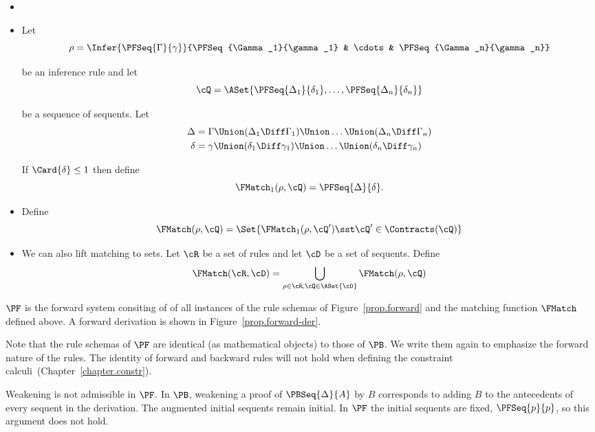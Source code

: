 \begin{definition}
  \begin{itemize}
  \item[]
  \item
    Let
    \[
    \rho = \Infer
    {\PFSeq{\Gamma}{\gamma}}
    {\PFSeq{\Gamma_1}{\gamma_1} & \cdots & \PFSeq{\Gamma_n}{\gamma_n}}
    \]

    \noindent
    be an inference rule and let
    \[
    \cQ = \ASet{\PFSeq{\Delta_1}{\delta_1}, \ldots, \PFSeq{\Delta_n}{\delta_n}}
    \]

    \noindent be a sequence of sequents.  Let
    \begin{align*}
      \Delta &= \Gamma\Union (\Delta_1\Diff\Gamma_1) \Union \dots\Union(\Delta_n\Diff\Gamma_n)\\
      \delta &= \gamma\Union (\delta_1\Diff\gamma_1) \Union \dots\Union(\delta_n\Diff\gamma_n)\\
    \end{align*}

    \noindent
    If $\Card{\delta}\leq 1$ then define
    \[
    \FMatch_1(\rho, \cQ)=\PFSeq{\Delta}{\delta}.
    \]
  \item Define
    \[
    \FMatch(\rho, \cQ)= \Set{\FMatch_1(\rho, \cQ') \sst \cQ'\in\Contracts(\cQ)}
    \]

  \item We can also lift matching to sets.
    Let $\cR$ be a set of rules and let $\cD$ be a set of sequents.
    Define
    \[
    \FMatch(\cR, \cD) =
    \bigcup_{\rho\in\cR, \cQ \in \ASet{\cD}} \FMatch(\rho, \cQ)
    \]
  \end{itemize}
\end{definition}

\begin{definition}
  $\PF$ is the forward system consiting of of all instances of
  the rule schemas of Figure~\ref{prop.forward} and the
  matching function $\FMatch$ defined above.
  A forward derivation is shown in Figure~\ref{prop.forward-der}.
\end{definition}

Note that the rule schemas of $\PF$ are identical (as mathematical objects)
to those of $\PB$.  We write them again to emphasize the forward nature
of the rules.  The identity of forward and backward rules will not hold
when defining the constraint calculi~(Chapter~\ref{chapter.constr}).

% 

\begin{remark}
  Weakening is not admissible in $\PF$.  In $\PB$, weakening a
  proof of $\PBSeq{\Delta}{A}$ by $B$ corresponds to adding $B$ to
  the antecedents of every sequent in the derivation.  The augmented
  initial sequents remain initial.  In $\PF$ the initial sequents
  are fixed, $\PFSeq{p}{p}$, so this argument does not hold.
\end{remark}

